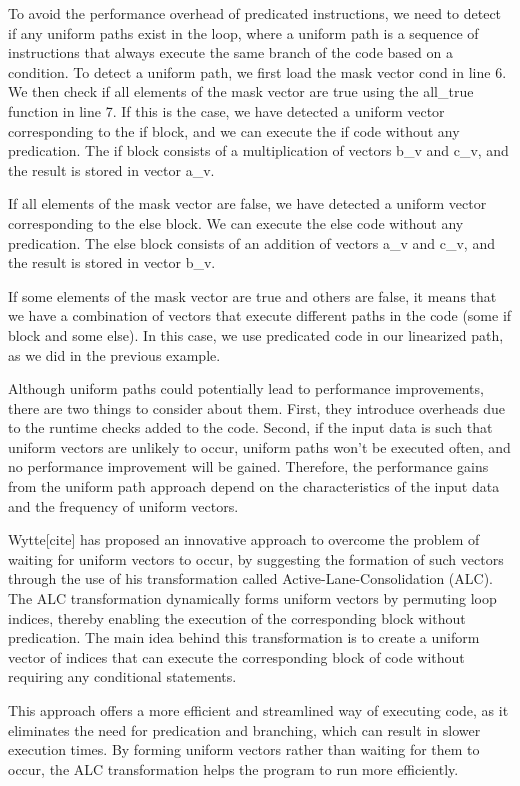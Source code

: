 \documentclass[\main/thesis.tex]{subfiles}
\begin{document}
To avoid the performance overhead of predicated instructions, we need to detect if any uniform paths exist in the loop, where a uniform path is a sequence of instructions that always execute the same branch of the code based on a condition. To detect a uniform path, we first load the mask vector cond in line 6. We then check if all elements of the mask vector are true using the all\_true function in line 7. If this is the case, we have detected a uniform vector corresponding to the if block, and we can execute the if code without any predication. The if block consists of a multiplication of vectors b\_v and c\_v, and the result is stored in vector a\_v.

If all elements of the mask vector are false, we have detected a uniform vector corresponding to the else block. We can execute the else code without any predication. The else block consists of an addition of vectors a\_v and c\_v, and the result is stored in vector b\_v.

If some elements of the mask vector are true and others are false, it means that we have a combination of vectors that execute different paths in the code (some if block and some else). In this case, we use predicated code in our linearized path, as we did in the previous example.

Although uniform paths could potentially lead to performance improvements, there are two things to consider about them. First, they introduce overheads due to the runtime checks added to the code. Second, if the input data is such that uniform vectors are unlikely to occur, uniform paths won't be executed often, and no performance improvement will be gained. Therefore, the performance gains from the uniform path approach depend on the characteristics of the input data and the frequency of uniform vectors.



Wytte[cite] has proposed an innovative approach to overcome the problem of waiting for uniform vectors to occur, by suggesting the formation of such vectors through the use of his transformation called Active-Lane-Consolidation (ALC). The ALC transformation dynamically forms uniform vectors by permuting loop indices, thereby enabling the execution of the corresponding block without predication. The main idea behind this transformation is to create a uniform vector of indices that can execute the corresponding block of code without requiring any conditional statements.

This approach offers a more efficient and streamlined way of executing code, as it eliminates the need for predication and branching, which can result in slower execution times. By forming uniform vectors rather than waiting for them to occur, the ALC transformation helps the program to run more efficiently.
\end{document}
